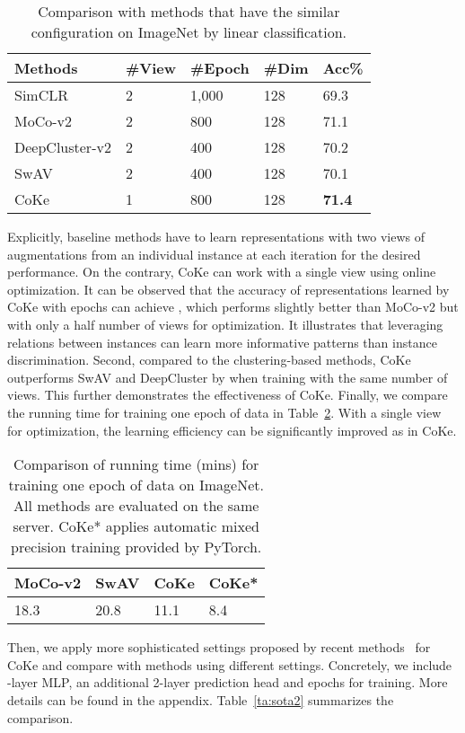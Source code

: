 \documentclass[10pt,twocolumn,letterpaper]{article}
\begin{document}
\begin{table}[!ht]
\centering
\begin{tabular}{|l|l|l|l|l|}\hline
Methods&\#View&\#Epoch&\#Dim&Acc\%\\\hline
SimCLR&2&1,000&128& 69.3\\
MoCo-v2&2&800&128&71.1\\
DeepCluster-v2&2&400&128&70.2\\
SwAV&2&400&128&70.1\\\hline
CoKe&1&800&128&\textbf{71.4}\\\hline
\end{tabular}
\caption{Comparison with methods that have the similar configuration on ImageNet by linear classification.}\label{ta:sota1}
\end{table}

Explicitly, baseline methods have to learn representations with two views of augmentations from an individual instance at each iteration for the desired performance. On the contrary, CoKe can work with a single view using online optimization. It can be observed that the accuracy of representations learned by CoKe with  epochs can achieve , which performs slightly better than MoCo-v2 but with only a half number of views for optimization. It illustrates that leveraging relations between instances can learn more informative patterns than instance discrimination. Second, compared to the clustering-based methods, CoKe outperforms SwAV and DeepCluster by  when training with the same number of views. This further demonstrates the effectiveness of CoKe. Finally, we compare the running time for training one epoch of data in Table~\ref{ta:time}. With a single view for optimization, the learning efficiency can be significantly improved as in CoKe. 

\begin{table}[!ht]
\centering
\begin{tabular}{|l|l|l|l|}\hline
MoCo-v2&SwAV&CoKe&CoKe*\\\hline
18.3&20.8& 11.1 &8.4 \\\hline
\end{tabular}
\caption{Comparison of running time (mins) for training one epoch of data on ImageNet. All methods are evaluated on the same server. CoKe* applies automatic mixed precision training provided by PyTorch.}\label{ta:time}
\end{table}

Then, we apply more sophisticated settings proposed by recent methods~\cite{GrillSATRBDPGAP20, ChenKSNH20} for CoKe and compare with methods using different settings. Concretely, we include -layer MLP, an additional 2-layer prediction head and  epochs for training. More details can be found in the appendix. Table~\ref{ta:sota2} summarizes the comparison.
\end{document}

